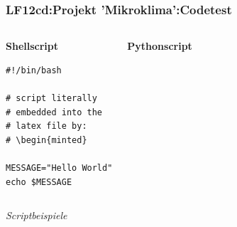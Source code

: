 \begin{frame}[fragile]  
  \frametitle{LF12cd:Projekt 'Mikroklima':Codetest}

  \begin{columns}[t]
    \begin{center}
    \begin{minipage}{0.5\textwidth}
      \textbf{Shellscript}

      \begin{verbatim}
#!/bin/bash

# script literally 
# embedded into the
# latex file by:
# \begin{minted}

MESSAGE="Hello World"
echo $MESSAGE
      \end{verbatim}

    \end{minipage}
    \end{center}
    \begin{center}
    \begin{minipage}{0.5\textwidth}
      \textbf{Pythonscript}
      \inputminted [fontsize=\small,linenos]{python}{\snpLf/tpl-hw.py}
    \end{minipage}
    \end{center}
  \end{columns}

  \vspace{0.6cm}
  \begin{flushright}
    \begin{tiny}
      \textrm{\textit{Scriptbeispiele}}
    \end{tiny}
  \end{flushright}
\end{frame}


